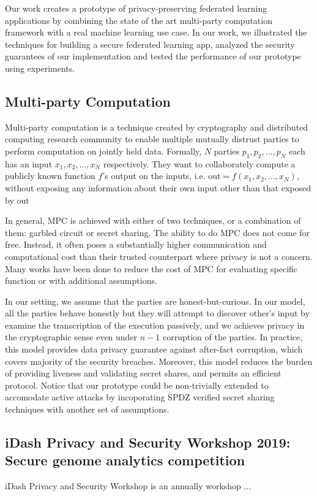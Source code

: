 \documentclass[a4paper,12pt]{article}
\begin{document}
Our work creates a prototype of privacy-preserving federated learning applications by combining the state of the art multi-party computation framework with a real machine learning use case. In our work, we illustrated the techniques for building a secure federated learning app, analyzed the security guarantees of our implementation and tested the performance of our prototype using experiments.

\subsection{Multi-party Computation}
Multi-party computation is a technique created by cryptography and distributed computing research community to enable multiple mutually distrust parties to perform computation on jointly held data. Formally, $N$ parties $p_1, p_2, ..., p_N$ each has an input $x_1, x_2, ..., x_N$ respectively. They want to collaborately compute a publicly known function $f$'s output on the inputs, i.e. $\text{out}=f(x_1, x_2, ..., x_N)$, without exposing any information about their own input other than that exposed by $\text{out}$ 

In general, MPC is achieved with either of two techniques, or a combination of them: garbled circuit or secret sharing. The ability to do MPC does not come for free. Instead, it often poses a substantially higher communication and computational cost than their trusted counterpart where privacy is not a concern. Many works have been done to reduce the cost of MPC for evaluating specific function or with additional assumptions. 

In our setting, we assume that the parties are honest-but-curious. In our model, all the parties behave honestly but they will attempt to discover other's input by examine the transcription of the execution passively, and we achieves privacy in the cryptographic sense even under $n-1$ corruption of the parties. In practice, this model provides data privacy guarantee against after-fact corruption, which covers majority of the security breaches. Moreover, this model reduces the burden of providing liveness and validating secret shares, and permits an efficient protocol. Notice that our prototype could be non-trivially extended to accomodate active attacks by incoporating SPDZ verified secret sharing techniques with another set of assumptions. 


\subsection{iDash Privacy and Security Workshop 2019: Secure genome analytics competition}
iDash Privacy and Security Workshop is an annually workshop ...
\end{document}
